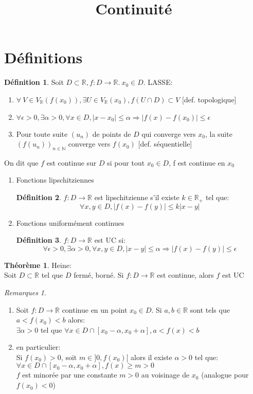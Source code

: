 \documentclass[fleqn]{article}
\title{Continuit\'e}
\date{}
\theoremstyle{definition} \newtheorem*{defi}{D\'efinition}
\theoremstyle{definition} \newtheorem*{theo}{Th\'eor\`eme}
\theoremstyle{definition} \newtheorem*{coro}{Corollaire}
\theoremstyle{remark} \newtheorem*{rqs}{Remarques}
\begin{document}
\maketitle

\section{D\'efinitions}
\begin{defi}
	Soit $D \subset \mathbb{R}, f:D \rightarrow \mathbb{R}.\ x_0 \in D$. LASSE:
	\begin{enumerate}
		\item $\forall\ V \in V_\mathbb{R}(f(x_0)), \exists U \in V_\mathbb{R}(x_0), f(U \cap D) \subset V$ [def. topologique]
		\item $\forall \epsilon>0, \exists \alpha > 0, \forall x \in D, |x-x_0| \leq \alpha \Rightarrow |f(x) - f(x_0)| \leq \epsilon$
		\item Pour toute suite $(u_n)$ de points de $D$ qui converge vers $x_0$, la suite $(f(u_n))_{n\in\mathbb{N}}$ converge vers $f(x_0)$
		[def. s\'equentielle]
	\end{enumerate}
	On dit que $f$ est continue sur $D$ si pour tout $x_0 \in D$, f est continue en $x_0$
\end{defi}
\begin{enumerate}
	\item Fonctions lipschitziennes
		\begin{defi} $f:D \rightarrow \mathbb{R}$ est lipschitzienne s'il existe $k \in \mathbb{R}_+$ tel que:
			\[\forall x,y \in D, |f(x) - f(y)| \leq k|x-y|\]
		\end{defi}
	\item Fonctions uniform\'ement continues
		\begin{defi} $f:D \rightarrow \mathbb{R}$ est UC si:
		\[\forall \epsilon >0, \exists \alpha>0, \forall x,y \in D, |x-y| \leq \alpha \Rightarrow |f(x) - f(y)| \leq \epsilon\]
	\end{defi}
\end{enumerate}
\begin{theo} Heine: \\
	Soit $D \subset \mathbb{R}$ tel que $D$ ferm\'e, born\'e. Si $f:D \rightarrow \mathbb{R}$ est continue, alors $f$ est UC
\end{theo}
\begin{rqs} $ $
	\begin{enumerate}
		\item Soit $f: D \rightarrow \mathbb{R}$ continue en un point $x_0 \in D$. Si $a, b \in \mathbb{R}$ sont tels que $a < f(x_0) < b$
			alors: \\
			$ \exists \alpha > 0$ tel que $\forall x \in D \cap [x_0 - \alpha, x_0 + \alpha], a < f(x) < b$
		\item en particulier: \\
			Si $f(x_0) > 0$, soit $m \in ]0, f(x_0)[$ alors il existe $\alpha >0$ tel que:
			$\forall x \in D \cap [x_0 - \alpha, x_0 + \alpha], f(x) \geq m > 0$ \\
			$f$ est minor\'ee par une constante $m>0$ au voisinage de $x_0$ (analogue pour $f(x_0) < 0$)
	\end{enumerate}
\end{rqs}
\end{document}
